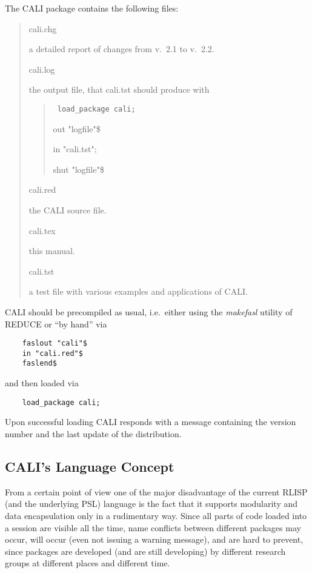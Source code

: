 \documentclass[a4paper,11pt]{article}
\newcommand{\pbx}[1]{\mbox{}\hfill \parbox[t]{12cm}{#1} \pagebreak[3]}
\begin{document}
The CALI package contains the following files:
\begin{quote}
cali.chg

\pbx{a detailed report of changes from v.\ 2.1 to v.\ 2.2.}

cali.log

\pbx{the output file, that cali.tst should produce with
\begin{quote} \tt
load\_package cali;

out "logfile"\$

in "cali.tst";

shut "logfile"\$
\end{quote}}

cali.red

\pbx{the CALI source file.}

cali.tex

\pbx{this manual.}

cali.tst

\pbx{a test file with various examples and applications of CALI.}

\end{quote}

CALI should be precompiled as usual, i.e.\ either using the {\em
makefasl} utility of REDUCE or ``by hand'' via
\begin{verbatim}
    faslout "cali"$
    in "cali.red"$
    faslend$
\end{verbatim}
and then loaded via
\begin{verbatim}
    load_package cali;
\end{verbatim}
Upon successful loading CALI responds with a message containing the
version number and the last update of the distribution. 

\begin{center}
\end{center}

\subsection{CALI's Language Concept}

From a certain point of view one of the major disadvantage of the
current RLISP (and the underlying PSL) language is the fact
that it supports modularity and data encapsulation only in a
rudimentary way.  Since all parts of code loaded into a session are
visible all the time, name conflicts between different packages may
occur, will occur (even not issuing a warning message), and are hard
to prevent, since packages are developed (and are still developing)
by different research groups at different places and different time.
\end{document}
